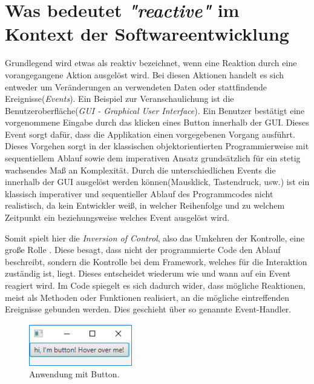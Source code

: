 \chapter{Was bedeutet \textit{"reactive"} im Kontext der Softwareentwicklung}\label{was_ist_reactive_programming}
Grundlegend wird etwas als reaktiv bezeichnet, wenn eine Reaktion durch eine vorangegangene Aktion ausgelöst wird. Bei diesen Aktionen handelt es sich entweder um Veränderungen an verwendeten Daten oder stattfindende Ereignisse(\textit{Events}). Ein Beispiel zur Veranschaulichung ist die Benutzeroberfläche(\textit{GUI - Graphical User Interface}). Ein Benutzer bestätigt eine vorgenommene Eingabe durch das klicken eines Button innerhalb der GUI. Dieses Event sorgt dafür, dass die Applikation einen vorgegebenen Vorgang ausführt. Dieses Vorgehen sorgt in der klassischen objektorientierten Programmierweise mit sequentiellem Ablauf sowie dem imperativen Ansatz grundsätzlich für ein stetig wachsendes Maß an Komplexität. Durch die unterschiedlichen Events die innerhalb der GUI ausgelöst werden können(Mausklick, Tastendruck, usw.) ist ein klassisch imperativer und sequentieller Ablauf des Programmcodes nicht realistisch, da kein Entwickler weiß, in welcher Reihenfolge und zu welchem Zeitpunkt ein beziehungsweise welches Event ausgelöst wird.

 Somit spielt hier die \textit{Inversion of Control}, also das Umkehren der Kontrolle, eine große Rolle \cite{MartinFowler.2005}. Diese besagt, dass nicht der programmierte Code den Ablauf beschreibt, sondern die Kontrolle bei dem Framework, welches für die Interaktion zuständig ist, liegt. Dieses entscheidet wiederum wie und wann auf ein Event reagiert wird. Im Code spiegelt es sich dadurch wider, dass mögliche Reaktionen, meist als Methoden oder Funktionen realisiert, an die mögliche eintreffenden Ereignisse gebunden werden. Dies geschieht über so genannte Event-Handler. \\
 \begin{figure}[hbt]
 	\centering
 	\includegraphics[width=0.4\textwidth]{Abb/buttonapp.PNG}
 	\caption{Anwendung mit Button.}
 	\label{pic:buttonapp}
 \end{figure}
